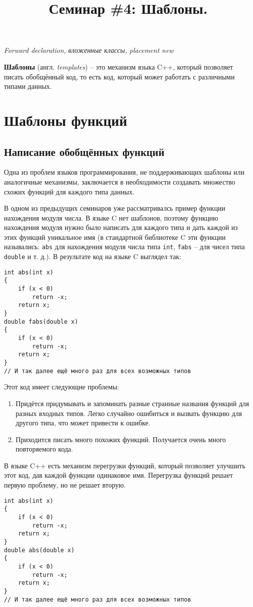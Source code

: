 \documentclass{article}
\begin{document}
\title{Семинар \#4: Шаблоны. \vspace{-5ex}}\date{}\maketitle

\textit{Forward declaration, вложенные классы, placement new}

\textbf{Шаблоны} (англ. \textit{templates}) -- это механизм языка C++, который позволяет писать обобщённый код, то есть код, который может работать с различными типами данных.

\section*{Шаблоны функций}
\subsection*{Написание обобщённых функций}
Одна из проблем языков программирования, не поддерживающих шаблоны или аналогичные механизмы, заключается в необходимости создавать множество схожих функций для каждого типа данных. 

В одном из предыдущих семинаров уже рассматривалсь пример функции нахождения модуля числа. В языке C нет шаблонов, поэтому функцию нахождения модуля нужно было написать для каждого типа и дать каждой из этих функций уникальное имя (в стандартной библиотеке C эти функции назывались: \texttt{abs} для нахождения модуля числа типа \texttt{int}, \texttt{fabs} -- для чисел типа \texttt{double} и т. д.). В результате код на языке C выглядел так:
\begin{lstlisting}
int abs(int x)
{
	if (x < 0)
		return -x;
	return x;
}
double fabs(double x)
{
	if (x < 0)
		return -x;
	return x;
}
// И так далее ещё много раз для всех возможных типов
\end{lstlisting}
Этот код имеет следующие проблемы:
\begin{enumerate}
\item Придётся придумывать и запоминать разные странные названия функций для разных входных типов. Легко случайно ошибиться и вызвать функцию для другого типа, что может привести к ошибке.

\item Приходится писать много похожих функций. Получается очень много повторяемого кода.
\end{enumerate}
В языке C++ есть механизм перегрузки функций, который позволяет улучшить этот код, дав каждой функции одинаковое имя. Перегрузка функций решает первую проблему, но не решает вторую.
\begin{lstlisting}
int abs(int x)
{
	if (x < 0)
		return -x;
	return x;
}
double abs(double x)
{
	if (x < 0)
		return -x;
	return x;
}
// И так далее ещё много раз для всех возможных типов
\end{lstlisting}
\end{document}
